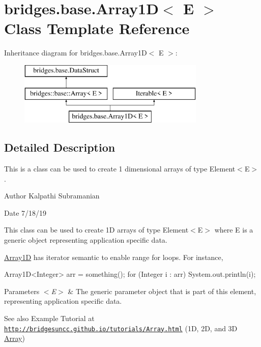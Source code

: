 \hypertarget{classbridges_1_1base_1_1_array1_d}{}\section{bridges.\+base.\+Array1D$<$ E $>$ Class Template Reference}
\label{classbridges_1_1base_1_1_array1_d}
Inheritance diagram for bridges.\+base.\+Array1D$<$ E $>$\+:\begin{figure}[H]
\begin{center}
\leavevmode
\includegraphics[height=3.000000cm]{classbridges_1_1base_1_1_array1_d}
\end{center}
\end{figure}


\subsection{Detailed Description}
This is a class can be used to create 1 dimensional arrays of type Element$<$\+E$>$. 

\begin{DoxyAuthor}{Author}
Kalpathi Subramanian
\end{DoxyAuthor}
\begin{DoxyDate}{Date}
7/18/19
\end{DoxyDate}
This class can be used to create 1D arrays of type Element$<$\+E$>$ where E is a generic object representing application specific data.

\hyperlink{classbridges_1_1base_1_1_array1_d}{Array1D} has iterator semantic to enable range for loops. For instance,


\begin{DoxyCode}
Array1D<Integer> arr = something();
\textcolor{keywordflow}{for} (Integer i : arr)
  System.out.println(i);
\end{DoxyCode}



\begin{DoxyParams}{Parameters}
{\em $<$\+E$>$} & The generic parameter object that is part of this element, representing application specific data.\\
\hline
\end{DoxyParams}
\begin{DoxySeeAlso}{See also}
Example Tutorial at ~\newline
 \href{http://bridgesuncc.github.io/tutorials/Array.html}{\tt http\+://bridgesuncc.\+github.\+io/tutorials/\+Array.\+html} (1D, 2D, and 3D \hyperlink{classbridges_1_1base_1_1_array}{Array})~\newline
 
\end{DoxySeeAlso}
